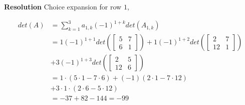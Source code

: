 \documentclass[12pt]{beamer}
\begin{document}
	\begin{frame}
	\textbf{ Resolution} 
Choice expansion for row $1$,

	\begin{align*}
		det(A) &= \sum_{k=1}^{3} a_{1,k} (-1)^{1+k} det\left( A_{1,k} \right) \\
		&= 1 (-1)^{1+1 }det \left( 
		\begin{bmatrix}
			5 & 7 \\
			6 & 1	
		\end{bmatrix} \right)  + 1 (-1)^{1+2} det \left(
		\begin{bmatrix}
			2 & 7 \\
			12 & 1
		\end{bmatrix} \right)  \\
		&+ 3 (-1)^{1+3} det \left( 
		\begin{bmatrix}
			2 & 5 \\
			12 & 6
		\end{bmatrix}
		\right) \\
		&=  1 \cdot ( 5 \cdot 1 - 7 \cdot 6 )  
		+ (-1)( 2 \cdot 1 - 7  \cdot 12 ) \\
		&+ 3 \cdot 1 \cdot (2 \cdot 6 - 5 \cdot 12 ) \\
		&= -37 + 82  - 144 = -99 
	\end{align*}
	\end{frame}
	
\end{document}
